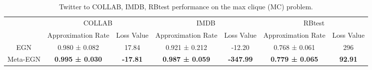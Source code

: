 \begin{table}[]
\centering
\fontsize{8}{8}\selectfont
\setlength\tabcolsep{3pt}
\begin{tabular}{@{}ccccccc@{}}
\toprule
\multirow{}{}{} & \multicolumn{2}{c}{COLLAB} & \multicolumn{2}{c}{IMDB} & \multicolumn{2}{c}{RBtest} \\ \cmidrule(l){2-7} 
 & Approximation Rate & Loss Value & Approximation Rate & Loss Value & Approximation Rate & Loss Value \\ \midrule
EGN & 0.980 ± 0.082 & 17.84 & 0.921 ± 0.212 & -12.20 & 0.768 ± 0.061 & 296 \\
Meta-EGN & \textbf{0.995 ± 0.030} & \textbf{-17.81} & \textbf{0.987 ± 0.059} & \textbf{-347.99} & \textbf{0.779 ± 0.065} & \textbf{92.91} \\ \bottomrule
\end{tabular}
\vspace{-0.3cm}
\caption{Twitter to COLLAB, IMDB, RBtest performance on the max clique (MC) problem.}
\vspace{-0.6cm}
\label{tab:generalization_real_real}
\end{table}
\fi
